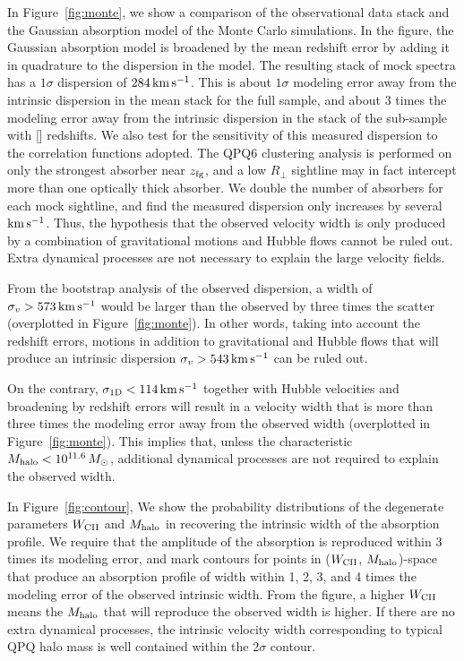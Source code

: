 \documentclass[iop]{emulateapj}
\begin{document}
In Figure~\ref{fig:monte}, we show a comparison of the observational data stack and the Gaussian 
absorption model of the Monte Carlo simulations. In the figure, the Gaussian absorption model is 
broadened by the mean redshift error by adding it in quadrature to the dispersion in the model. 
The resulting stack of mock spectra has a $1\sigma$ dispersion of $284\,{\rm km\,s^{-1}}$. This is 
about $1\sigma$ modeling error away from the intrinsic dispersion in the  mean stack for 
the full sample, and about 3 times the modeling error away from the intrinsic dispersion in the 
stack of the sub-sample with [] redshifts. We also test for the 
sensitivity of this measured dispersion to the correlation functions adopted. The QPQ6 clustering 
analysis is performed on only the strongest absorber near $z_{\rm fg}$, and a low $R_\perp$ 
sightline may in fact intercept more than one optically thick absorber. We double the number of 
absorbers for each mock sightline, and find the measured dispersion only increases by several 
${\rm km\,s^{-1}}$. Thus, the hypothesis that the observed velocity width is only produced by a 
combination of gravitational motions and Hubble flows cannot be ruled out. Extra dynamical 
processes are not necessary to explain the large velocity fields. 

From the bootstrap 
analysis of the observed dispersion, a width of $\sigma_v>573\,{\rm km\,s^{-1}}$ would be larger 
than the observed by three times the scatter (overplotted in Figure~\ref{fig:monte}). In other 
words, taking into account the redshift errors, motions in addition to gravitational and Hubble 
flows that will produce an intrinsic dispersion $\sigma_v>543\,{\rm km\,s^{-1}}$ can be ruled out. 

On the contrary, 
$\sigma_{\rm 1D}<114\,{\rm km\,s^{-1}}$ together with Hubble velocities and 
broadening by redshift errors will result in a velocity width that is more than three times the 
modeling error away from the observed width (overplotted in Figure~\ref{fig:monte}). This implies 
that, unless the characteristic $M_{\rm halo}<10^{11.6}\,M_\odot$, 
additional dynamical processes are not required to explain the observed width.  

In Figure~\ref{fig:contour}, We show the probability distributions of the degenerate parameters 
$W_{\rm CII}$ and $M_{\rm halo}$ in recovering the intrinsic width of the absorption profile. We 
require that the amplitude of the absorption is reproduced within 3 times its modeling error, and 
mark contours for points in ($W_{\rm CII}$, $M_{\rm halo}$)-space that produce an absorption 
profile of width within 1, 2, 3, and 4 times the modeling error of the observed intrinsic width. 
From the figure, a higher $W_{\rm CII}$ means the $M_{\rm halo}$ that will reproduce the observed 
width is higher. If there are no extra dynamical processes, the intrinsic velocity width 
corresponding to typical QPQ halo mass is well contained within the 2$\sigma$ contour. 
\end{document}
